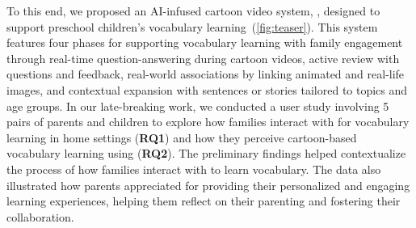 To this end, we proposed an AI-infused cartoon video system, \name{}, designed to support preschool children's vocabulary learning~(\autoref{fig:teaser}). 
This system features four phases for supporting vocabulary learning with family engagement through real-time question-answering during cartoon videos, active review with questions and feedback, real-world associations by linking animated and real-life images, and contextual expansion with sentences or stories tailored to topics and age groups. 
In our late-breaking work, we conducted a user study involving 5 pairs of parents and children to explore how families interact with \name{} for vocabulary learning in home settings (\textbf{RQ1}) and how they perceive cartoon-based vocabulary learning using \name{} (\textbf{RQ2}).
The preliminary findings helped contextualize the process of how families interact with \name{} to learn vocabulary. The data also illustrated how parents appreciated \name{} for providing their personalized and engaging learning experiences, helping them reflect on their parenting and fostering their collaboration.